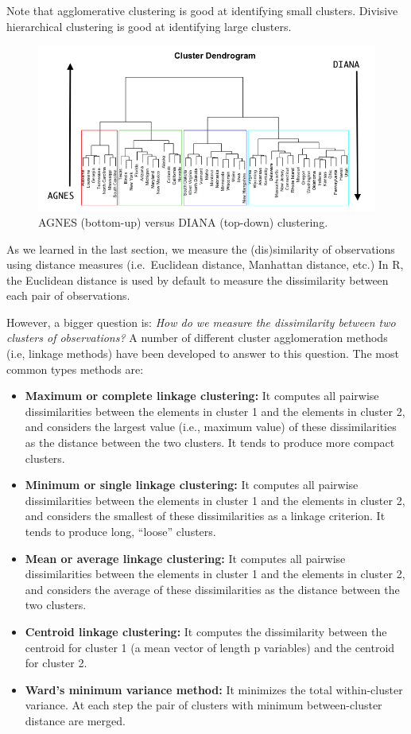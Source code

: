 \documentclass[]{book}
\providecommand{\tightlist}{%
  \setlength{\itemsep}{0pt}\setlength{\parskip}{0pt}}
\theoremstyle{definition}
\theoremstyle{definition}
\theoremstyle{definition}
\theoremstyle{remark}
\let\BeginKnitrBlock\begin \let\EndKnitrBlock\end
\begin{document}
\BeginKnitrBlock{tip}
Note that agglomerative clustering is good at identifying small
clusters. Divisive hierarchical clustering is good at identifying large
clusters.
\EndKnitrBlock{tip}

\begin{figure}

{\centering \includegraphics[width=0.7\linewidth]{illustrations/dendrogram2} 

}

\caption{AGNES (bottom-up) versus DIANA (top-down) clustering.}\label{fig:dendrogram2}
\end{figure}

As we learned in the last section, we measure the (dis)similarity of
observations using distance measures (i.e.~Euclidean distance, Manhattan
distance, etc.) In R, the Euclidean distance is used by default to
measure the dissimilarity between each pair of observations.

However, a bigger question is: \emph{How do we measure the dissimilarity
between two clusters of observations?} A number of different cluster
agglomeration methods (i.e, linkage methods) have been developed to
answer to this question. The most common types methods are:

\begin{itemize}
\tightlist
\item
  \textbf{Maximum or complete linkage clustering:} It computes all
  pairwise dissimilarities between the elements in cluster 1 and the
  elements in cluster 2, and considers the largest value (i.e., maximum
  value) of these dissimilarities as the distance between the two
  clusters. It tends to produce more compact clusters.
\item
  \textbf{Minimum or single linkage clustering:} It computes all
  pairwise dissimilarities between the elements in cluster 1 and the
  elements in cluster 2, and considers the smallest of these
  dissimilarities as a linkage criterion. It tends to produce long,
  ``loose'' clusters.
\item
  \textbf{Mean or average linkage clustering:} It computes all pairwise
  dissimilarities between the elements in cluster 1 and the elements in
  cluster 2, and considers the average of these dissimilarities as the
  distance between the two clusters.
\item
  \textbf{Centroid linkage clustering:} It computes the dissimilarity
  between the centroid for cluster 1 (a mean vector of length p
  variables) and the centroid for cluster 2.
\item
  \textbf{Ward's minimum variance method:} It minimizes the total
  within-cluster variance. At each step the pair of clusters with
  minimum between-cluster distance are merged.
\end{itemize}
\end{document}
